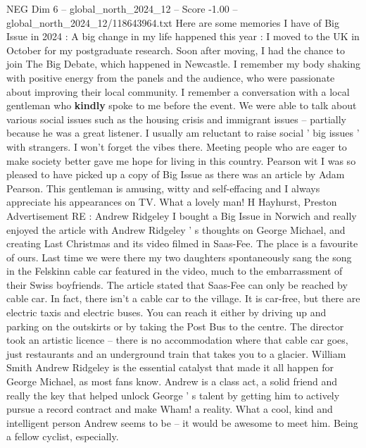\begin{textsample}{NEG Dim 6 – global\_north\_2024\_12 – Score -1.00 – global\_north\_2024\_12/118643964.txt}
Here are some memories I have of Big Issue in 2024 : A big change in my life happened this year : I moved to the UK in October for my postgraduate research.
Soon after moving, I had the chance to join The Big Debate, which happened in Newcastle.
I remember my body shaking with positive energy from the panels and the audience, who were passionate about improving their local community.
I remember a conversation with a local gentleman who \textbf{kindly} spoke to me before the event.
We were able to talk about various social issues such as the housing crisis and immigrant issues -- partially because he was a great listener.
I usually am reluctant to raise social ' big issues ' with strangers.
I won't forget the vibes there.
Meeting people who are eager to make society better gave me hope for living in this country.
Pearson wit I was so pleased to have picked up a copy of Big Issue as there was an article by Adam Pearson.
This gentleman is amusing, witty and self-effacing and I always appreciate his appearances on TV.
What a lovely man!
H Hayhurst, Preston Advertisement RE : Andrew Ridgeley I bought a Big Issue in Norwich and really enjoyed the article with Andrew Ridgeley ' s thoughts on George Michael, and creating Last Christmas and its video filmed in Saas-Fee.
The place is a favourite of ours.
Last time we were there my two daughters spontaneously sang the song in the Felskinn cable car featured in the video, much to the embarrassment of their Swiss boyfriends.
The article stated that Saas-Fee can only be reached by cable car.
In fact, there isn't a cable car to the village.
It is car-free, but there are electric taxis and electric buses.
You can reach it either by driving up and parking on the outskirts or by taking the Post Bus to the centre.
The director took an artistic licence -- there is no accommodation where that cable car goes, just restaurants and an underground train that takes you to a glacier.
William Smith Andrew Ridgeley is the essential catalyst that made it all happen for George Michael, as most fans know.
Andrew is a class act, a solid friend and really the key that helped unlock George ' s talent by getting him to actively pursue a record contract and make Wham! a reality.
What a cool, kind and intelligent person Andrew seems to be -- it would be awesome to meet him.
Being a fellow cyclist, especially.

\end{textsample}
